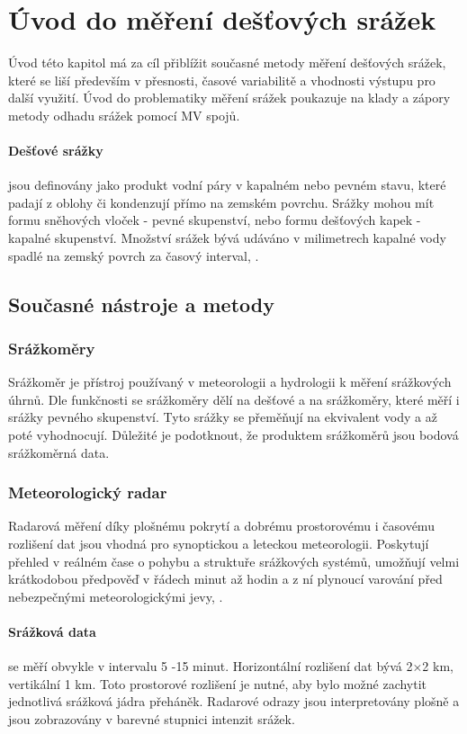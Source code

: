\documentclass[a4paper,12pt,oneside]{report}
\begin{document}
\section{Úvod do měření dešťových srážek}
Úvod této kapitol má za cíl přiblížit současné metody měření dešťových
srážek, které se liší především v přesnosti, časové variabilitě a
vhodnosti výstupu pro další využití. Úvod do problematiky měření
srážek poukazuje na klady a zápory metody odhadu srážek pomocí MV spojů.


\paragraph*{Dešťové srážky}jsou definovány jako produkt vodní páry v
kapalném nebo pevném stavu, které padají z oblohy či kondenzují přímo
na zemském povrchu. Srážky mohou mít formu sněhových vloček - pevné
skupenství, nebo formu dešťových kapek - kapalné skupenství. Množství
srážek bývá udáváno v milimetrech kapalné vody spadlé na zemský povrch
za časový interval, \cite{wmo}.

\subsection{Současné nástroje a metody }
\label{subsec:11}

\subsubsection{Srážkoměry}
Srážkoměr je přístroj používaný v meteorologii a hydrologii k měření
srážkových úhrnů. Dle funkčnosti se srážkoměry dělí na dešťové a na
srážkoměry, které měří i srážky pevného skupenství. Tyto srážky se
přeměňují na ekvivalent vody a až poté vyhodnocují. Důležité je
podotknout, že produktem srážkoměrů jsou bodová srážkoměrná data.

\subsubsection{Meteorologický radar}
Radarová měření díky plošnému pokrytí a dobrému prostorovému i
časovému rozlišení dat jsou vhodná pro synoptickou a leteckou
meteorologii. Poskytují přehled v reálném čase o pohybu a struktuře
srážkových systémů, umožňují velmi krátkodobou předpověď v řádech
minut až hodin a z ní plynoucí varování před nebezpečnými
meteorologickými jevy, \cite{radar_chmu}.

\paragraph*{Srážková data} se měří obvykle v intervalu 5 -15
minut. Horizontální rozlišení dat bývá 2×2 km, vertikální 1 km. Toto
prostorové rozlišení je nutné, aby bylo možné zachytit jednotlivá
srážková jádra přeháněk. Radarové odrazy jsou interpretovány plošně a
jsou zobrazovány v barevné stupnici intenzit srážek.
\end{document}
